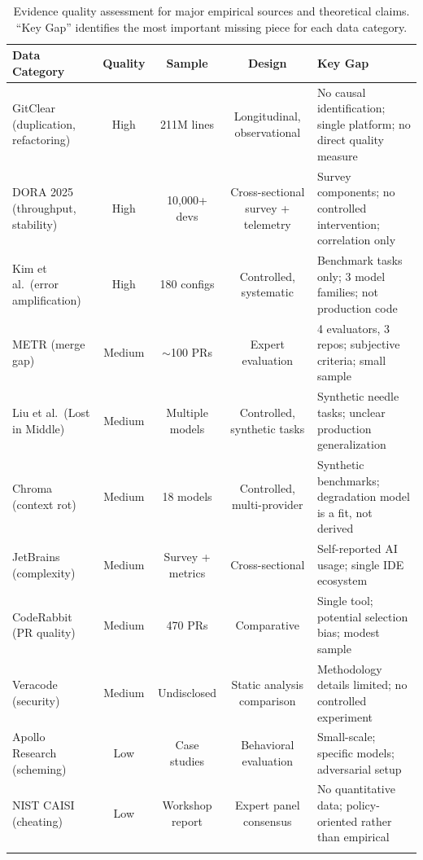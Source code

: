 \documentclass[11pt, a4paper, logo, copyright]{googledeepmind}
\begin{document}
\begin{table}[H]
\centering
\caption{Evidence quality assessment for major empirical sources and theoretical claims. ``Key Gap'' identifies the most important missing piece for each data category.}
\label{tab:evidence-quality}
\small
\begin{tabular}{p{3cm}cccp{4.2cm}}
\toprule
\textbf{Data Category} & \textbf{Quality} & \textbf{Sample} & \textbf{Design} & \textbf{Key Gap} \\
\midrule
GitClear (duplication, refactoring) & High & 211M lines & Longitudinal, observational & No causal identification; single platform; no direct quality measure \\
\addlinespace
DORA 2025 (throughput, stability) & High & 10,000+ devs & Cross-sectional survey + telemetry & Survey components; no controlled intervention; correlation only \\
\addlinespace
Kim et al.\ (error amplification) & High & 180 configs & Controlled, systematic & Benchmark tasks only; 3 model families; not production code \\
\addlinespace
METR (merge gap) & Medium & $\sim$100 PRs & Expert evaluation & 4 evaluators, 3 repos; subjective criteria; small sample \\
\addlinespace
Liu et al.\ (Lost in Middle) & Medium & Multiple models & Controlled, synthetic tasks & Synthetic needle tasks; unclear production generalization \\
\addlinespace
Chroma (context rot) & Medium & 18 models & Controlled, multi-provider & Synthetic benchmarks; degradation model is a fit, not derived \\
\addlinespace
JetBrains (complexity) & Medium & Survey + metrics & Cross-sectional & Self-reported AI usage; single IDE ecosystem \\
\addlinespace
CodeRabbit (PR quality) & Medium & 470 PRs & Comparative & Single tool; potential selection bias; modest sample \\
\addlinespace
Veracode (security) & Medium & Undisclosed & Static analysis comparison & Methodology details limited; no controlled experiment \\
\addlinespace
Apollo Research (scheming) & Low & Case studies & Behavioral evaluation & Small-scale; specific models; adversarial setup \\
\addlinespace
NIST CAISI (cheating) & Low & Workshop report & Expert panel consensus & No quantitative data; policy-oriented rather than empirical \\
\addlinespace

\end{tabular}
\end{table}
\end{document}
